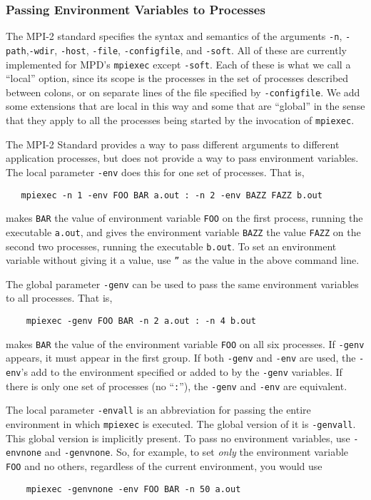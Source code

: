 \documentclass[dvipdfm,11pt]{article}
\begin{document}
\subsubsection{Passing Environment Variables to Processes}
\label{sec:environment}

The MPI-2 standard specifies the syntax and semantics of the arguments
\texttt{-n}, \texttt{-path},\texttt{-wdir}, \texttt{-host},
\texttt{-file}, \texttt{-configfile}, and \texttt{-soft}.  All of these
are currently implemented for MPD's \texttt{mpiexec} except
\texttt{-soft}.  Each of these is what we call a ``local'' option, since
its scope is the processes in the set of processes described between
colons, or on separate lines of the file specified by
\texttt{-configfile}.  We add some extensions that are local in this way
and some that are ``global'' in the sense that they apply to all the
processes being started by the invocation of \texttt{mpiexec}.

The MPI-2 Standard provides a way to pass different arguments to different
application processes, but does not provide a way to pass environment
variables.  The local parameter \texttt{-env} does this for one set of
processes.  That is,
\begin{verbatim}
   mpiexec -n 1 -env FOO BAR a.out : -n 2 -env BAZZ FAZZ b.out
\end{verbatim}
makes \texttt{BAR} the value of environment variable \texttt{FOO} on the
first process, running the executable \texttt{a.out}, and gives the
environment variable \texttt{BAZZ} the value \texttt{FAZZ} on the second
two processes, running the executable \texttt{b.out}.  To set an
environment variable without giving it a value, use \texttt{''} as the
value in the above command line.

The global parameter \texttt{-genv} can be used to pass the same
environment variables to all processes.  That is,
\begin{verbatim}
    mpiexec -genv FOO BAR -n 2 a.out : -n 4 b.out
\end{verbatim}
makes \texttt{BAR} the value of the environment variable \texttt{FOO} on
all six processes.  If \texttt{-genv} appears, it must appear in the
first group.  If both \texttt{-genv} and \texttt{-env} are used, the
\texttt{-env}'s add to the environment specified or added to by the
\texttt{-genv} variables.  If there is only one set of processes (no
``\texttt{:}''), the \texttt{-genv} and \texttt{-env} are equivalent.

The local parameter \texttt{-envall} is an abbreviation for passing the
entire environment in which \texttt{mpiexec} is executed.  The global
version of it is \texttt{-genvall}.  This global version is implicitly
present.  To pass no environment variables, use \texttt{-envnone} and
\texttt{-genvnone}.  So, for example, to set \emph{only} the environment
variable \texttt{FOO} and no others, regardless of the current
environment, you would use 
\begin{verbatim}
    mpiexec -genvnone -env FOO BAR -n 50 a.out
\end{verbatim}
\end{document}
